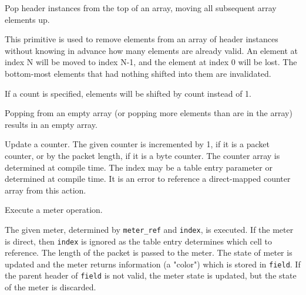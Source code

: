 \documentclass[12pt]{article}
\begin{document}

{ %
Pop header instances from the top of an array, moving all subsequent array elements up.
}
{ %
}
{ %
This primitive is used to remove elements from an array of header instances
without knowing in advance how many elements are already valid. An element at
index N will be moved to index N-1, and the element at index 0 will be lost. The
bottom-most elements that had nothing shifted into them are invalidated.


If a count is specified, elements will be shifted by count instead of 1.


Popping from an empty array (or popping more elements than are in the array)
results in an empty array.
}


{ %
Update a counter.
}
{ %
}
{ %
The given counter is incremented by 1, if it is a packet counter, or by the 
packet length, if it is a byte counter.  The counter array is determined 
at compile time.  The index may be a table entry parameter or determined at 
compile time. It is an error to reference a direct-mapped counter array from 
this action.
}


{ %
Execute a meter operation.
}
{ %
}
{ %
The given meter, determined by \texttt{meter_ref} and \texttt{index}, is executed. If the 
meter is direct, then \texttt{index} is ignored as the table entry determines which 
cell to reference. The length of the packet is passed to the meter. The state 
of meter is updated and the meter returns information (a "color") which is 
stored in \texttt{field}. If the parent header of \texttt{field} is not valid, the meter 
state is updated, but the state of the meter is discarded.

}
\end{document}
